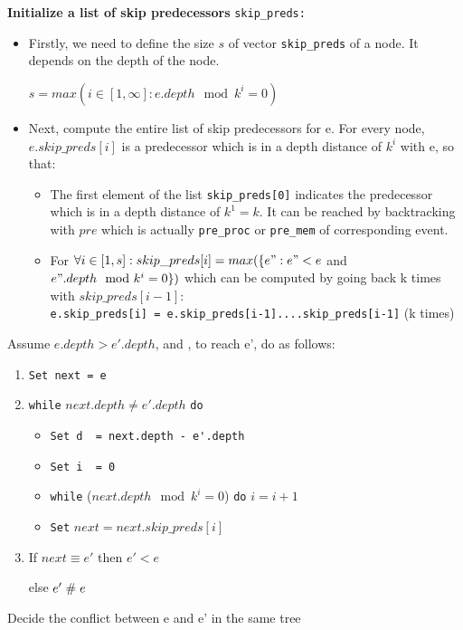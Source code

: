 \documentclass{llncs}
\begin{document}
\noindent
\textbf{Initialize a list of skip predecessors} \verb!skip_preds:!
\begin{itemize}
\item
	Firstly, we need to define the size $s$ of vector \verb!skip_preds! of a node. It depends on the depth of the node.

	 $s = max(i \in [1,\infty]: e.depth \mod k^{i} = 0 )$ 
\item
	Next, compute the entire list of skip predecessors for e. For every node, $e.skip\_preds[i]$ is a predecessor which is in a depth 			distance of $k^{i}$ with e, so that:
	\begin{itemize}
	\item
		The first element of the list \verb!skip_preds[0]! indicates the predecessor which is in a depth distance of $k^1 = k$. It can 				be reached by backtracking with $pre$ which is actually \verb!pre_proc! or \verb!pre_mem! of corresponding event.
	\item
		For $\forall i \in [1,s]: skip\_preds[i] = max(\{e": e" < e$ and $e".depth \mod k^i = 0\})$ which can be computed by going back 			k times with $skip\_preds[i-1]$: \\
		 \verb!e.skip_preds[i] = e.skip_preds[i-1]....skip_preds[i-1]! (k times) 
	\end{itemize}
\end{itemize}

\begin{algorithm}
\noindent
Assume $e.depth > e'.depth$, and , to reach e', do as follows:
\begin{enumerate}
\item
	\verb!Set next = e!
\item
	\verb!while! $next.depth \neq e'.depth$ \verb!do!
	\begin{itemize}
	\item
		\verb!Set d  = next.depth - e'.depth!
	\item
		\verb!Set i  = 0!
	\item
		\verb!while! ($ next.depth \mod k^{i} = 0$)   \space \verb!do!
		    $i = i + 1$
	\item
		\verb!Set! $next = next.skip\_preds[i]$ 
 	\end{itemize} 
\item 
	If $next \equiv e'$ then 
		$e'< e$ 
	
	else $e'\mathrel{\#} e$	 
\end{enumerate}
\caption{Decide the conflict between e and e' in the same tree}
\label{a:layer_tree}	
\end{algorithm}
\end{document}
